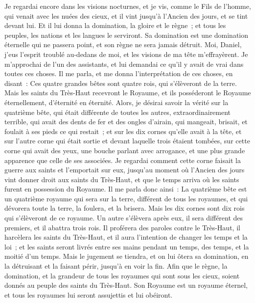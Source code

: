 \begin{multicols}{2}
Je regardai encore dans les visions nocturnes, et je vis, comme le Fils de l'homme, qui venait avec les nuées des cieux, et il vint jusqu'à l'Ancien des jours, et se tint devant lui.
Et il lui donna la domination, la gloire et le règne~; et tous les peuples, les nations et les langues le serviront. Sa domination est une domination éternelle qui ne passera point, et son règne ne sera jamais détruit.
Moi, Daniel, j'eus l'esprit troublé au-dedans de moi, et les visions de ma tête m'effrayèrent.
Je m'approchai de l'un des assistants, et lui demandai ce qu'il y avait de vrai dans toutes ces choses. Il me parla, et me donna l'interprétation de ces choses, en disant~:
Ces quatre grandes bêtes sont quatre rois, qui s'élèveront de la terre.
Mais les saints du Très-Haut recevront le Royaume, et ils posséderont le Royaume éternellement, d'éternité en éternité.
Alors, je désirai savoir la vérité sur la quatrième bête, qui était différente de toutes les autres, extraordinairement terrible, qui avait des dents de fer et des ongles d'airain, qui mangeait, brisait, et foulait à ses pieds ce qui restait~;
et sur les dix cornes qu'elle avait à la tête, et sur l'autre corne qui était sortie et devant laquelle trois étaient tombées, sur cette corne qui avait des yeux, une bouche parlant avec arrogance, et une plus grande apparence que celle de ses associées.
Je regardai comment cette corne faisait la guerre aux saints et l'emportait sur eux,
jusqu'au moment où l'Ancien des jours vint donner droit aux saints du Très-Haut, et que le temps arriva où les saints furent en possession du Royaume.
Il me parla donc ainsi~: La quatrième bête est un quatrième royaume qui sera sur la terre, différent de tous les royaumes, et qui dévorera toute la terre, la foulera, et la brisera.
Mais les dix cornes sont dix rois qui s'élèveront de ce royaume. Un autre s'élèvera après eux, il sera différent des premiers, et il abattra trois rois.
Il proférera des paroles contre le Très-Haut, il harcèlera les saints du Très-Haut, et il aura l'intention de changer les temps et la loi~; et les saints seront livrés entre ses mains pendant un temps, des temps, et la moitié d'un temps.
Mais le jugement se tiendra, et on lui ôtera sa domination, en la détruisant et la faisant périr, jusqu'à en voir la fin.
Afin que le règne, la domination, et la grandeur de tous les royaumes qui sont sous les cieux, soient donnés au peuple des saints du Très-Haut. Son Royaume est un royaume éternel, et tous les royaumes lui seront assujettis et lui obéiront.

\end{multicols}
